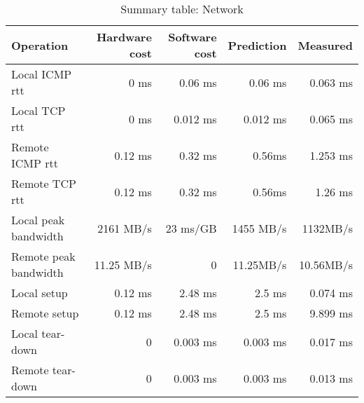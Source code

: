\begin{table}[h]
\begin{center}
\begin{tabular}{| l | r | r | r | r |} \hline
Operation 			& Hardware cost 	& Software cost 	& Prediction	& Measured \\ \hline

Local ICMP rtt	& 0 ms	& 0.06 ms & 0.06 ms  & 0.063 ms	\\ \hline
Local TCP rtt	& 0 ms	& 0.012 ms & 0.012 ms	& 0.065 ms\\ \hline
Remote ICMP rtt	& 0.12 ms	& 0.32 ms & 0.56ms  & 1.253 ms\\ \hline
Remote TCP rtt	& 0.12 ms	& 0.32 ms & 0.56ms  & 1.26 ms	\\ \hline\hline


Local peak bandwidth	&  2161 MB/s	& 23 ms/GB	&  1455 MB/s &  1132MB/s \\
\hline
Remote peak bandwidth 	&  11.25 MB/s	& 0 &  11.25MB/s	&  10.56MB/s \\
\hline\hline


Local setup 	&  0.12 ms	& 2.48 ms	&  2.5 ms & 0.074 ms \\ \hline
Remote setup	&  0.12 ms	& 2.48 ms	&  2.5 ms&  9.899 ms \\ \hline
Local tear-down 	&  0	& 0.003 ms	&  0.003 ms&  0.017 ms \\ \hline
Remote tear-down	&  0	& 0.003 ms	&  0.003 ms&  0.013 ms \\ \hline





\end{tabular}
\end{center}

\caption{Summary table: Network}

\end{table}












